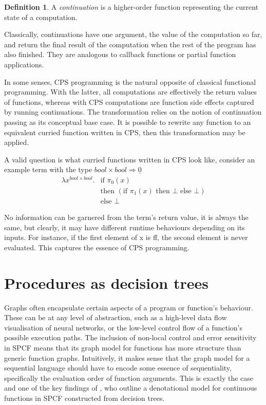 \documentclass[12pt,a4paper]{report}
\theoremstyle{definition}
\theoremstyle{definition}
\newtheorem{definition}{Definition}[chapter]%
\theoremstyle{remark}
\begin{document}
\begin{definition}
    A \emph{continuation} is a higher-order function representing the current state of a computation.
    
    Classically, continuations have one argument, the value of the computation so far, and return the final result of the computation when the rest of the program has also finished. They are analogous to callback functions or partial function applications. 
\end{definition}

In some senses, CPS programming is the natural opposite of classical functional programming. With the latter, all computations are effectively the return values of functions, whereas with CPS computations are function side effects captured by running continuations. The transformation relies on the notion of continuation passing as its conceptual base case. It is possible to rewrite any function to an equivalent curried function written in CPS, then this transformation may be applied.

A valid question is what curried functions written in CPS look like, consider an example term with the type $bool \times bool \Rightarrow \underline{0}$
\[
\begin{split}
\lambda x^{bool \times bool}. &\text{if } \pi_0(x)  \\
&\text{then }( \text{if } \pi_1(x) \text{ then } \bot \text{ else } \bot )\\
&\text{else } \bot
\end{split}
\]

No information can be garnered from the term's return value, it is always the same, but clearly, it may have different runtime behaviours depending on its inputs. For instance, if the first element of x is ff, the second element is never evaluated. This captures the essence of CPS programming.

\section{Procedures as decision trees}
Graphs often encapsulate certain aspects of a program or function's behaviour. These can be at any level of abstraction, such as a high-level data flow visualisation of neural networks, or the low-level control flow of a function's possible execution paths. The inclusion of non-local control and error sensitivity in SPCF means that its graph model for functions has more structure than generic function graphs. Intuitively, it makes sense that the graph model for a sequential language should have to encode some essence of sequentiality, specifically the evaluation order of function arguments. This is exactly the case and one of the key findings of \cite{cartwright_1992}, who outline a denotational model for continuous functions in SPCF constructed from decision trees. 
\end{document}
